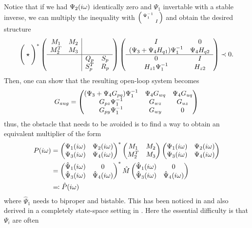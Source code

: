 Notice that if we had $\Psi_2(i\omega)$ identically zero and $\Psi_1$ invertable with a stable inverse, we can multiply 
the inequality with $\begin{psmallmatrix}\Psi_1^{-1}&\\&I\end{psmallmatrix}$ and obtain the desired structure 
\[
\Bigg(\star\Bigg)^*
\left(
\begin{array}{cc|cc}
M_1&M_2&&\\M^T_2&M_3&&\\\hline &&Q_p&S_p\\&&S_p^T&R_p
\end{array}
\right)
\left(
\begin{array}{cc}
	I&0\\
	(\Psi_3 + \Psi_4H_{q1})\Psi_1^{-1} &\Psi_4H_{q2}\\\hline
	0& I\\
	H_{z1}\Psi_1^{-1} &H_{z2}
\end{array}
\right)
\prec 0.
\]
Then, one can show that the resulting open-loop system becomes 
\begin{equation}
G_{aug} = \begin{pmatrix}
(\Psi_3 + \Psi_4G_{pq})\Psi_1^{-1} &\Psi_4G_{wq} &\Psi_4G_{uq}\\
G_{pz}\Psi_1^{-1}                  &G_{wz}       &G_{uz}\\
G_{py}\Psi_1^{-1}                  &G_{wy}       &0\\
\end{pmatrix}
\label{eq:augplant}
\end{equation}
thus, the obstacle that needs to be avoided is to find a way to obtain an equivalent multiplier of the form
\begin{align}
P(\iw) &= \pmatr{\Psi_1(\iw)&\Psi_2(\iw)\\ \Psi_3(\iw)&\Psi_4(\iw)}^*\pmatr{M_1&M_2\\M^T_2&M_3}\pmatr{\Psi_1(\iw)&\Psi_2(\iw)\\ \Psi_3(\iw)&\Psi_4(\iw)} \\
&= \pmatr{\hat{\Psi}_1(\iw)&0\\ \hat{\Psi}_3(\iw)&\hat{\Psi}_4(\iw)}^*\hat{M}\pmatr{\hat{\Psi}_1(\iw)&0\\ \hat{\Psi}_3(\iw)&\hat{\Psi}_4(\iw)}\\
&\mathrel{\reflectbox{$\coloneqq$}} \hat{P}(\iw)
\end{align}
where $\hat{\Psi}_1$ needs to biproper and bistable. This has been noticed in \cite{goh96,goh962} and also derived 
in a completely state-space setting in \cite{veenmanIFAC}. Here the essential difficulty is that $\Psi_i$ are often 
